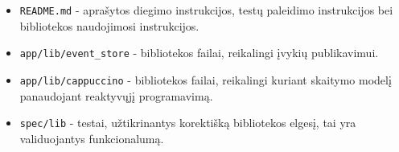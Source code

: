 \begin{itemize}
  \item \lstinline|README.md| - aprašytos diegimo instrukcijos, testų paleidimo instrukcijos bei bibliotekos naudojimosi instrukcijos.
  \item \lstinline|app/lib/event_store| - bibliotekos failai, reikalingi įvykių publikavimui.
  \item \lstinline|app/lib/cappuccino| - bibliotekos failai, reikalingi kuriant skaitymo modelį panaudojant reaktyvųjį programavimą.
  \item \lstinline|spec/lib| - testai, užtikrinantys korektišką bibliotekos elgesį, tai yra validuojantys funkcionalumą.
\end{itemize}
